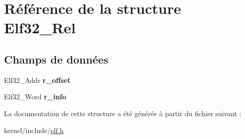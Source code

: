 \hypertarget{structElf32__Rel}{\section{Référence de la structure Elf32\+\_\+\+Rel}
\label{structElf32__Rel}
}
\subsection*{Champs de données}
\begin{DoxyCompactItemize}
\item 
\hypertarget{structElf32__Rel_addcf5ef67ababeb4940889e912c11eff}{Elf32\+\_\+\+Addr {\bfseries r\+\_\+offset}}\label{structElf32__Rel_addcf5ef67ababeb4940889e912c11eff}

\item 
\hypertarget{structElf32__Rel_a81c52bb1589056c5d37d58b9bfe2a046}{Elf32\+\_\+\+Word {\bfseries r\+\_\+info}}\label{structElf32__Rel_a81c52bb1589056c5d37d58b9bfe2a046}

\end{DoxyCompactItemize}


La documentation de cette structure a été générée à partir du fichier suivant \+:\begin{DoxyCompactItemize}
\item 
kernel/include/\hyperlink{elf_8h}{elf.\+h}\end{DoxyCompactItemize}
